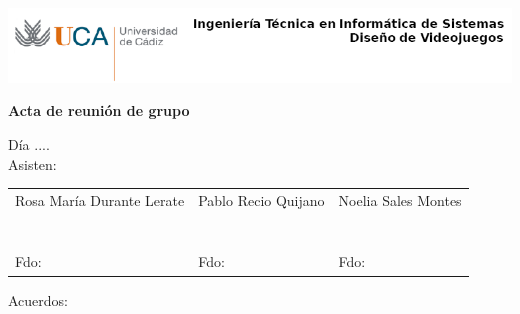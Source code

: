 \documentclass[a4paper,10pt]{article}
\begin{document}
\includegraphics[scale=0.6]{../uca.png}

\begin{center}
  \noindent \huge\textbf{ Acta de reunión de grupo}\\
\end{center}

\noindent Día ....\\

\noindent Asisten:

\begin{center}
\begin{tabular}{|m{5.2cm}|m{5.2cm}|m{5.2cm}|}
  \hline
  Rosa María Durante Lerate & Pablo Recio Quijano & Noelia Sales Montes\\
  & & \\
  & & \\
  & & \\
  & & \\
  & & \\
  & & \\
  & & \\
  Fdo: & Fdo: & Fdo: \\
  \hline
\end{tabular}
\end{center}

\noindent Acuerdos:
\end{document}
